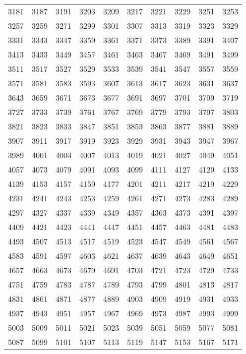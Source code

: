 \begin{longtable}{llllllllll}
3181	&	3187	&	3191	&	3203	&	3209	&	3217	&	3221	&	3229	&	3251	&	3253	\\
3257	&	3259	&	3271	&	3299	&	3301	&	3307	&	3313	&	3319	&	3323	&	3329	\\
3331	&	3343	&	3347	&	3359	&	3361	&	3371	&	3373	&	3389	&	3391	&	3407	\\
3413	&	3433	&	3449	&	3457	&	3461	&	3463	&	3467	&	3469	&	3491	&	3499	\\
3511	&	3517	&	3527	&	3529	&	3533	&	3539	&	3541	&	3547	&	3557	&	3559	\\
3571	&	3581	&	3583	&	3593	&	3607	&	3613	&	3617	&	3623	&	3631	&	3637	\\
3643	&	3659	&	3671	&	3673	&	3677	&	3691	&	3697	&	3701	&	3709	&	3719	\\
3727	&	3733	&	3739	&	3761	&	3767	&	3769	&	3779	&	3793	&	3797	&	3803	\\
3821	&	3823	&	3833	&	3847	&	3851	&	3853	&	3863	&	3877	&	3881	&	3889	\\
3907	&	3911	&	3917	&	3919	&	3923	&	3929	&	3931	&	3943	&	3947	&	3967	\\
3989	&	4001	&	4003	&	4007	&	4013	&	4019	&	4021	&	4027	&	4049	&	4051	\\
4057	&	4073	&	4079	&	4091	&	4093	&	4099	&	4111	&	4127	&	4129	&	4133	\\
4139	&	4153	&	4157	&	4159	&	4177	&	4201	&	4211	&	4217	&	4219	&	4229	\\
4231	&	4241	&	4243	&	4253	&	4259	&	4261	&	4271	&	4273	&	4283	&	4289	\\
4297	&	4327	&	4337	&	4339	&	4349	&	4357	&	4363	&	4373	&	4391	&	4397	\\
4409	&	4421	&	4423	&	4441	&	4447	&	4451	&	4457	&	4463	&	4481	&	4483	\\
4493	&	4507	&	4513	&	4517	&	4519	&	4523	&	4547	&	4549	&	4561	&	4567	\\
4583	&	4591	&	4597	&	4603	&	4621	&	4637	&	4639	&	4643	&	4649	&	4651	\\
4657	&	4663	&	4673	&	4679	&	4691	&	4703	&	4721	&	4723	&	4729	&	4733	\\
4751	&	4759	&	4783	&	4787	&	4789	&	4793	&	4799	&	4801	&	4813	&	4817	\\
4831	&	4861	&	4871	&	4877	&	4889	&	4903	&	4909	&	4919	&	4931	&	4933	\\
4937	&	4943	&	4951	&	4957	&	4967	&	4969	&	4973	&	4987	&	4993	&	4999	\\
5003	&	5009	&	5011	&	5021	&	5023	&	5039	&	5051	&	5059	&	5077	&	5081	\\
5087	&	5099	&	5101	&	5107	&	5113	&	5119	&	5147	&	5153	&	5167	&	5171	\\

\end{longtable}
